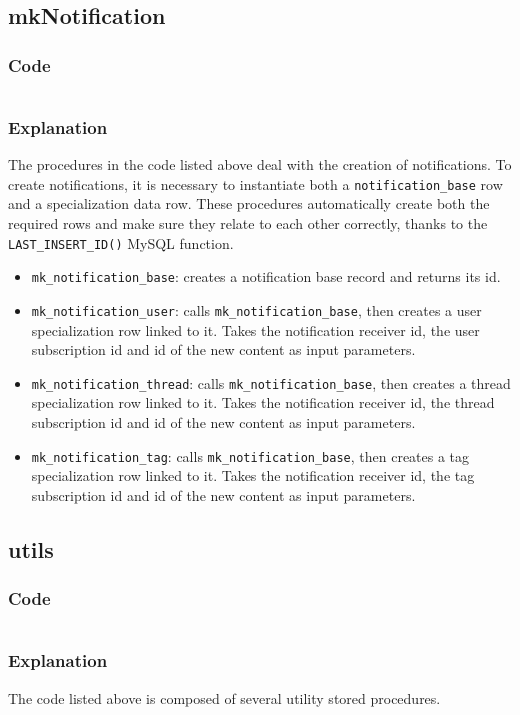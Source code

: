 \documentclass[12pt]{report}
\newcommand{\printSQLtest}[1]
{
    \inputminted[linenos, breaklines, breakbytoken, tabsize=4, fontsize=\footnotesize]{mysql}{#1}
}
\newcommand{\printSQLTablepage}[2]
{    
    \subsection{#2}
    \subsubsection{Code}
    \printSQLtest{../sql/parts/#1}
    \subsubsection{Explanation}
}
\begin{document}
                \newpage

                \printSQLTablepage{23_procsMkNotification.sql}{mkNotification}
                     The procedures in the code listed above deal with the creation of notifications. To create notifications, it is necessary to instantiate both a \texttt{notification_base} row and a specialization data row.
                    These procedures automatically create both the required rows and make sure they relate to each other correctly, thanks to the \texttt{LAST_INSERT_ID()} MySQL function.

                    \begin{itemize}
                        \item \texttt{mk_notification_base}: creates a notification base record and returns its id.
                         \item \texttt{mk_notification_user}: calls \texttt{mk_notification_base}, then creates a user specialization row linked to it.
                        Takes the notification receiver id, the user subscription id and id of the new content as input parameters.
                        \item \texttt{mk_notification_thread}: calls \texttt{mk_notification_base}, then creates a thread specialization row linked to it.
                        Takes the notification receiver id, the thread subscription id and id of the new content as input parameters.
                        \item \texttt{mk_notification_tag}: calls \texttt{mk_notification_base}, then creates a tag specialization row linked to it.
                        Takes the notification receiver id, the tag subscription id and id of the new content as input parameters.
                    \end{itemize}

                \newpage

                \printSQLTablepage{24_procsUtils.sql}{utils}
                    The code listed above is composed of several utility stored procedures.
\end{document}
